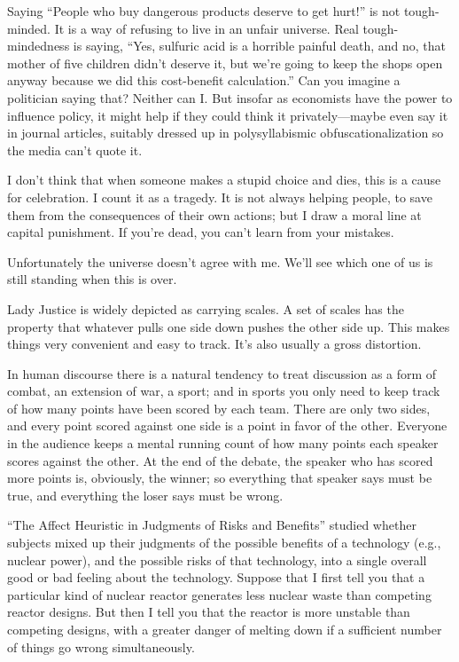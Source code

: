 {
 Saying ``People who buy dangerous products
deserve to get hurt!'' is not tough-minded. It is a
way of refusing to live in an unfair universe. Real tough-mindedness is
saying, ``Yes, sulfuric acid is a horrible painful
death, and no, that mother of five children didn't
deserve it, but we're going to keep the shops open
anyway because we did this cost-benefit
calculation.'' Can you imagine a politician saying
that? Neither can I. But insofar as economists have the power to
influence policy, it might help if they could think it
privately---maybe even say it in journal articles, suitably dressed up
in polysyllabismic obfuscationalization so the media
can't quote it.}

{
 I don't think that when someone makes a stupid
choice and dies, this is a cause for celebration. I count it as a
tragedy. It is not always helping people, to save them from the
consequences of their own actions; but I draw a moral line at capital
punishment. If you're dead, you can't
learn from your mistakes.}

{
 Unfortunately the universe doesn't agree with me.
We'll see which one of us is still standing when this
is over.}

\myendsectiontext


{
 Lady Justice is widely depicted as carrying scales. A set of
scales has the property that whatever pulls one side down pushes the
other side up. This makes things very convenient and easy to track.
It's also usually a gross distortion. }

{
 In human discourse there is a natural tendency to treat discussion
as a form of combat, an extension of war, a sport; and in sports you
only need to keep track of how many points have been scored by each
team. There are only two sides, and every point scored against one side
is a point in favor of the other. Everyone in the audience keeps a
mental running count of how many points each speaker scores against the
other. At the end of the debate, the speaker who has scored more points
is, obviously, the winner; so everything that speaker says must be
true, and everything the loser says must be wrong.}

{
 ``The Affect Heuristic in Judgments of Risks and
Benefits'' studied whether subjects mixed up their
judgments of the possible benefits of a technology (e.g., nuclear
power), and the possible risks of that technology, into a single
overall good or bad feeling about the technology.
Suppose that I first tell you that a particular kind of nuclear reactor
generates less nuclear waste than competing reactor designs. But then I
tell you that the reactor is more unstable than competing designs, with
a greater danger of melting down if a sufficient number of things go
wrong simultaneously.}

